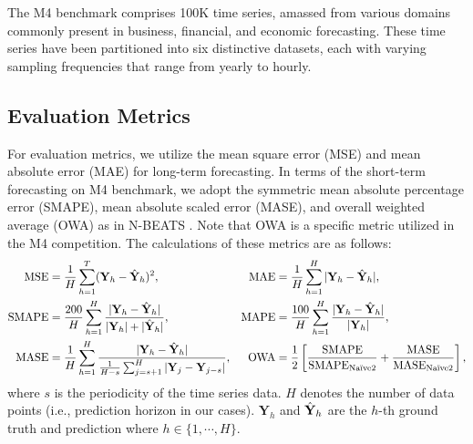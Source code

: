 The M4 benchmark comprises 100K time series, amassed from various domains commonly present in business, financial, and economic forecasting. These time series have been partitioned into six distinctive datasets, each with varying sampling frequencies that range from yearly to hourly.

\subsection{Evaluation Metrics}
For evaluation metrics, we utilize the mean square error (MSE) and mean absolute error (MAE) for long-term forecasting. In terms of the short-term forecasting on M4 benchmark, we adopt the symmetric mean absolute percentage error (SMAPE), mean absolute scaled error (MASE), and overall weighted average (OWA) as in N-BEATS \citep{oreshkin2019n}. Note that OWA is a specific metric utilized in the M4 competition. The calculations of these metrics are as follows:
\begin{align*} \label{equ:metrics}
    \text{MSE} &= \frac{1}{H}\sum_{h=1}^T (\mathbf{Y}_{h} - \Hat{\mathbf{Y}}_{h})^2,
    &
    \text{MAE} &= \frac{1}{H}\sum_{h=1}^H|\mathbf{Y}_{h} - \Hat{\mathbf{Y}}_{h}|,\\
    \text{SMAPE} &= \frac{200}{H} \sum_{h=1}^H \frac{|\mathbf{Y}_{h} - \Hat{\mathbf{Y}}_{h}|}{|\mathbf{Y}_{h}| + |\Hat{\mathbf{Y}}_{h}|},
    &
    \text{MAPE} &= \frac{100}{H} \sum_{h=1}^H \frac{|\mathbf{Y}_{h} - \Hat{\mathbf{Y}}_{h}|}{|\mathbf{Y}_{h}|}, \\
    \text{MASE} &= \frac{1}{H} \sum_{h=1}^H \frac{|\mathbf{Y}_{h} - \Hat{\mathbf{Y}}_{h}|}{\frac{1}{H-s}\sum_{j=s+1}^{H}|\mathbf{Y}_j - \mathbf{Y}_{j-s}|},
    &
    \text{OWA} &= \frac{1}{2} \left[ \frac{\text{SMAPE}}{\text{SMAPE}_{\textrm{Naïve2}}}  + \frac{\text{MASE}}{\text{MASE}_{\textrm{Naïve2}}}  \right],
\end{align*}
where $s$ is the periodicity of the time series data. $H$ denotes the number of data points (i.e., prediction horizon in our cases). $\mathbf{Y}_{h}$ and $\Hat{\mathbf{Y}}_{h}$ are the $h$-th ground truth and prediction where $h \in \{1, \cdots, H\}$.


